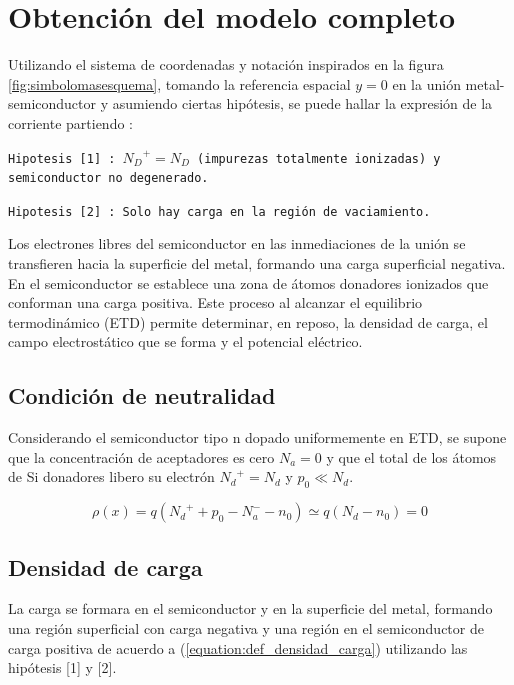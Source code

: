 \documentclass[a4paper]{article}
\begin{document}
\section{Obtención del modelo completo}

Utilizando el sistema de coordenadas y notación inspirados en la figura \ref{fig:simbolomasesquema}, tomando la referencia espacial $y = 0$ en la unión metal-semiconductor y asumiendo ciertas hipótesis, se puede hallar la expresión de la corriente partiendo :

\texttt{Hipotesis [1] : ${N_D}^+ = N_D $ (impurezas totalmente ionizadas) y semiconductor no degenerado.}

\texttt{Hipotesis [2] : Solo hay carga en la región de vaciamiento.}


 Los electrones libres del semiconductor en las inmediaciones de la unión se transfieren hacia la superficie del metal, formando una carga superficial negativa. En el semiconductor se establece una zona de átomos donadores ionizados que conforman una carga positiva. Este proceso al alcanzar el equilibrio termodinámico (ETD) permite determinar, en reposo, la densidad de carga, el campo electrostático que se forma y el potencial eléctrico.

\subsection{Condición de neutralidad}

Considerando el semiconductor tipo n dopado uniformemente en ETD, se supone que la concentración de aceptadores es cero $N_a = 0$ y que el total de los átomos de Si donadores libero su electrón $ {N_d}^{+} = N_d$ y $p_0 \ll N_d$.

\begin{equation}
	\rho(x) = q\left( {N_d}^{+} + p_0 - N_a^{-} - n_0 \right)
	\simeq q\left( N_d - n_0 \right) = 0
\end{equation}

\subsection{Densidad de carga}

La carga se formara en el semiconductor y en la superficie del metal, formando una región superficial con carga negativa y una región en el semiconductor de carga positiva de acuerdo a (\ref{equation:def_densidad_carga}) utilizando las hipótesis [1] y [2].
\end{document}
